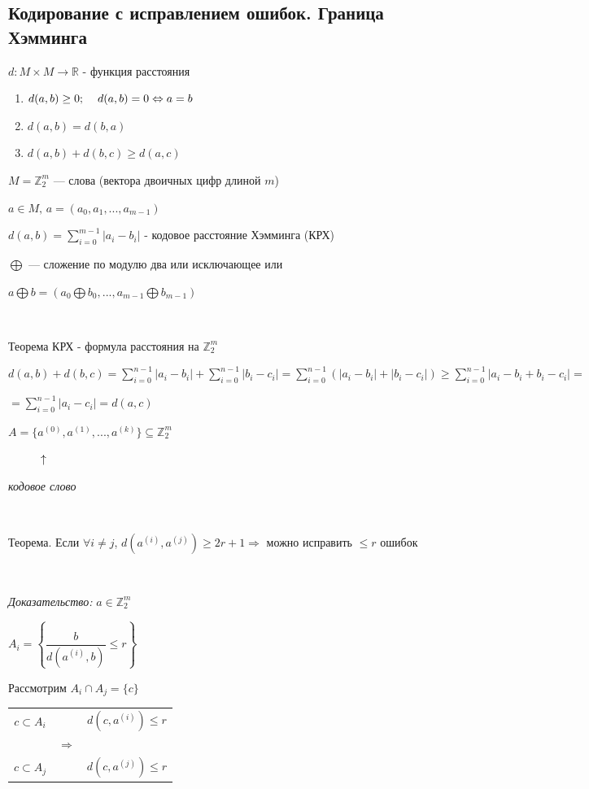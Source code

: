 \documentclass[12pt]{article}
\begin{document}
\subsection{Кодирование с исправлением ошибок. Граница Хэмминга}
$d:M\times M \rightarrow \mathbb{R}$ - функция расстояния
\begin{enumerate}
    \item $d(a,b) \geq 0; \hspace{4 mm} d(a,b) = 0 \Leftrightarrow a = b$
    \item $d(a,b) = d(b,a)$
    \item $d(a,b) + d(b,c) \geq d(a,c)$
\end{enumerate}\par
$M = \mathbb{Z}_2^m$ — слова (вектора двоичных цифр длиной $m$)\par
$a \in M, \,a = (a_0, a_1, ..., a_{m-1})$\par
$d(a,b) = \sum\limits_{i=0}^{m-1} |a_i - b_i|$ - кодовое расстояние Хэмминга (КРХ)\par
$\bigoplus$ — сложение по модулю два или исключающее или\par
$a \bigoplus b = (a_0 \bigoplus b_0, ... , a_{m-1} \bigoplus b_{m-1})$\par
$ $\par
Теорема КРХ - формула расстояния на $\mathbb{Z}_2^m$\par
$d(a,b)+d(b,c) = \sum\limits_{i=0}^{n-1}|a_i - b_i|+\sum\limits_{i=0}^{n-1}|b_i - c_i|=\sum\limits_{i=0}^{n-1}(|a_i - b_i|+|b_i - c_i|) \geq \sum\limits_{i=0}^{n-1}|a_i - b_i + b_i - c_i| =$\par
$ =\sum\limits_{i=0}^{n-1}|a_i - c_i| = d(a,c)$\par
$A=\{a^{(0)}, a^{(1)}, ... , a^{(k)}\} \subseteq \mathbb{Z}_2^m$\par
$\hspace{1 cm} \uparrow$\par
\textit{кодовое слово}\par
$ $\par
Теорема. Если $\forall i \neq j$, $d(a^{(i)},a^{(j)}) \geq 2r+1 \Rightarrow$ можно исправить $\leq r$ ошибок \par
$ $\par
\textit{Доказательство:} $a \in \mathbb{Z}_2^m$\par
$A_i = \left\{ \dfrac{b}{d(a^{(i)}, b)} \leq r \right\}$\par
Рассмотрим $A_i \cap A_j = \{ c \}$\par
\begin{tabular}{c|cc}
    $c \subset A_i$ &               & $d(c,a^{(i)}) \leq r$ \\
                    & $\Rightarrow$                         \\
    $c \subset A_j$ &               & $d(c,a^{(j)}) \leq r$ \\
\end{tabular}\par
\end{document}
